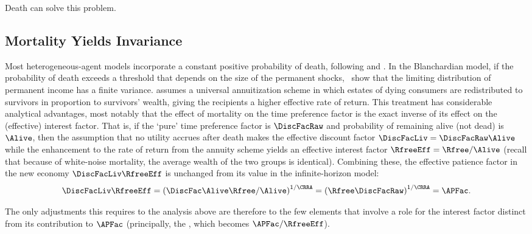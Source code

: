 \documentclass[BufferStockTheory]{subfiles}
\begin{document}
Death can solve this problem.


\hypertarget{Mortality}{}
\subsection{Mortality Yields Invariance}\label{sec:Mortality}

\hypertarget{Blanchard-Lives}{}
Most heterogeneous-agent models incorporate a constant positive probability of death, following \cite{blanchardFinite} and \cite{yaari1965uncertain}.
In the Blanchardian model, if the probability of death exceeds a threshold that depends on the size of the permanent shocks,~\cite{cstwMPC} show that the limiting distribution of permanent income has a finite variance.
\cite{blanchardFinite} assumes a universal annuitization scheme in which estates of dying consumers are redistributed to survivors in proportion to survivors' wealth, giving the recipients a higher effective rate of return.
This treatment has considerable analytical advantages, most notably that the effect of mortality on the time preference factor is the exact inverse of its effect on the (effective) interest factor.
That is, if the `pure' time preference factor is $\DiscFacRaw$ and probability of remaining alive (not dead) is $\Alive$, then the assumption that no utility accrues after death makes the effective discount factor $\DiscFacLiv=\DiscFacRaw\Alive$  while the enhancement to the rate of return from the annuity scheme yields an effective interest factor $\RfreeEff=\Rfree/\Alive$ (recall that because of white-noise mortality, the average wealth of the two groups is identical).
Combining these, the effective patience factor in the new economy $\DiscFacLiv \RfreeEff$ is unchanged from its value in the infinite-horizon model:%
\begin{equation}
  \DiscFacLiv \RfreeEff = {\left(\DiscFac \Alive \Rfree / \Alive\right)}^{1/\CRRA} = {\left(\Rfree \DiscFacRaw\right)}^{1/\CRRA} = \APFac.
\end{equation}

The only adjustments this requires to the analysis above are therefore to the few elements that involve a role for the interest factor distinct from its contribution to $\APFac$ (principally, the {\RIC}, which becomes $\APFac/\RfreeEff$).
\end{document}
